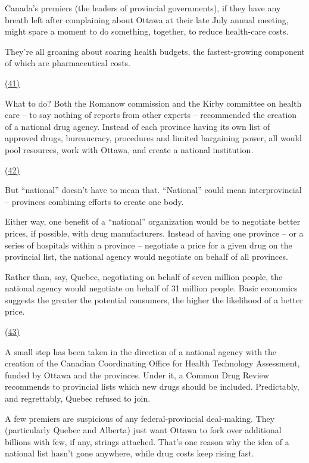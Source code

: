 \qquad Canada's premiers (the leaders of provincial governments), if they have any breath left after complaining about Ottawa at their late July annual meeting, might spare a moment to do something, together, to reduce health-care costs.

\qquad They're all groaning about soaring health budgets, the fastest-growing component of which are pharmaceutical costs.

\qquad \ul{(41) \qquad\qquad\qquad\qquad}

\qquad What to do? Both the Romanow commission and the Kirby committee on health care -- to say nothing of reports from other experts -- recommended the creation of a national drug agency. Instead of each province having its own list of approved drugs, bureaucracy, procedures and limited bargaining power, all would pool resources, work with Ottawa, and create a national institution.

\qquad \ul{(42) \qquad\qquad\qquad\qquad}

\qquad But ``national'' doesn't have to mean that. ``National'' could mean interprovincial -- provinces combining efforts to create one body.

\qquad Either way, one benefit of a ``national'' organization would be to negotiate better prices, if possible, with drug manufacturers. Instead of having one province -- or a series of hospitals within a province -- negotiate a price for a given drug on the provincial list, the national agency would negotiate on behalf of all provinces.

\qquad Rather than, say, Quebec, negotiating on behalf of seven million people, the national agency would negotiate on behalf of 31 million people. Basic economics suggests the greater the potential consumers, the higher the likelihood of a better price.

\qquad \ul{(43) \qquad\qquad\qquad\qquad}

\qquad A small step has been taken in the direction of a national agency with the creation of the Canadian Coordinating Office for Health Technology Assessment, funded by Ottawa and the provinces. Under it, a Common Drug Review recommends to provincial lists which new drugs should be included. Predictably, and regrettably, Quebec refused to join.

\qquad A few premiers are suspicious of any federal-provincial deal-making. They (particularly Quebec and Alberta) just want Ottawa to fork over additional billions with few, if any, strings attached. That's one reason why the idea of a national list hasn't gone anywhere, while drug costs keep rising fast.

